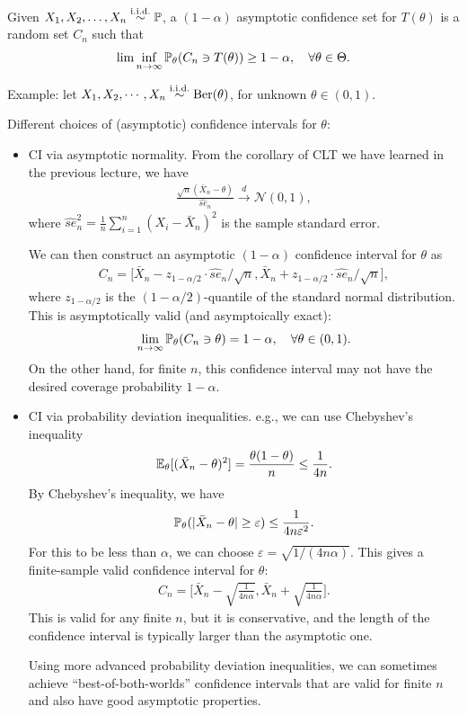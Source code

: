 \documentclass[11pt,letterpaper]{article}
\newcounter{lecture}
\numberwithin{theorem}{lecture}
\numberwithin{proposition}{lecture}
\numberwithin{lemma}{lecture}
\numberwithin{claim}{lecture}
\numberwithin{corollary}{lecture}
\numberwithin{definition}{lecture}
\numberwithin{conjecture}{lecture}
\numberwithin{remark}{lecture}
\numberwithin{example}{lecture}
\numberwithin{equation}{lecture}
\begin{document}
\begin{definition}
 Given $X_1, X_2, \ldots, X_n \overset{\mathrm{i.i.d.}}{\sim} {\mathbb{P}}$, a $(1 - \alpha)$ asymptotic confidence set for $T(\theta)$ is a random set $C_n$ such that
  \begin{align*}
    \lim\inf_{n \to \infty} {\mathbb{P}}_\theta(C_n \ni T(\theta)) \geq 1 - \alpha, \quad \forall \theta \in \Theta.
  \end{align*}
\end{definition}

Example: let $X_1, X_2, \cdots, X_n \overset{\mathrm{i.i.d.}}{\sim} \mathrm{Ber} (\theta)$, for unknown $\theta \in (0,1)$.

Different choices of (asymptotic) confidence intervals for $\theta$:
\begin{itemize}
  \item CI via asymptotic normality. From the corollary of CLT we have learned in the previous lecture, we have
  \begin{align*}
    \frac{\sqrt{n} (\bar{X}_n - \theta)}{\widehat{se}_n} \xrightarrow{d} \mathcal{N} (0, 1),
  \end{align*}
  where $\widehat{se}_n^2 = \frac{1}{n} \sum_{i=1}^n (X_i - \bar{X}_n)^2$ is the sample standard error.

  We can then construct an asymptotic $(1 - \alpha)$ confidence interval for $\theta$ as
  \begin{align*}
    C_n = \Big[\bar{X}_n - z_{1 - \alpha/2} \cdot \widehat{se}_n / \sqrt{n} , \bar{X}_n + z_{1 - \alpha/2} \cdot \widehat{se}_n / \sqrt{n}\Big],
  \end{align*}
  where $z_{1 - \alpha/2}$ is the $(1 - \alpha/2)$-quantile of the standard normal distribution. This is asymptotically valid (and asymptoically exact):
  \begin{align*}
    \lim_{n \to \infty} {\mathbb{P}}_\theta(C_n \ni \theta) = 1 - \alpha, \quad \forall \theta \in (0,1).
  \end{align*}
  On the other hand, for finite $n$, this confidence interval may not have the desired coverage probability $1 - \alpha$.
  \item CI via probability deviation inequalities. e.g., we can use Chebyshev's inequality
  \begin{align*}
    {\mathbb{E}}_\theta[(\bar{X}_n - \theta)^2] = \frac{\theta (1 - \theta)}{n} \leq \frac{1}{4 n}.
  \end{align*}
  By Chebyshev's inequality, we have
  \begin{align*}
    {\mathbb{P}}_\theta(|\bar{X}_n - \theta| \geq \varepsilon) \leq \frac{1}{4 n \varepsilon^2}.
  \end{align*}
  For this to be less than $\alpha$, we can choose $\varepsilon = \sqrt{1 / (4 n \alpha)}$. This gives a finite-sample valid confidence interval for $\theta$:
  \begin{align*}
    C_n = \Big[\bar{X}_n - \sqrt{\frac{1}{4 n \alpha}}, \bar{X}_n + \sqrt{\frac{1}{4 n \alpha}}\Big].
  \end{align*}
  This is valid for any finite $n$, but it is conservative, and the length of the confidence interval is typically larger than the asymptotic one.

  Using more advanced probability deviation inequalities, we can sometimes achieve ``best-of-both-worlds'' confidence intervals that are valid for finite $n$ and also have good asymptotic properties.
\end{itemize}
\end{document}
